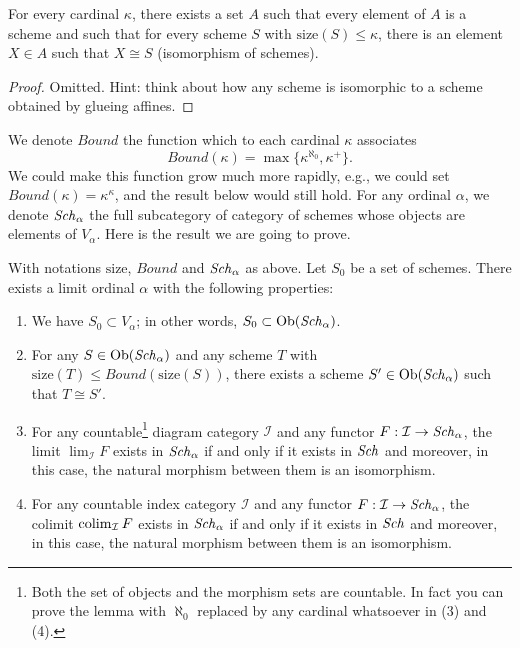 \begin{lemma}
\label{lemma-bounded-size}
For every cardinal $\kappa$, there exists a set $A$ such
that every element of $A$ is a scheme and such that for every
scheme $S$ with $\text{size}(S) \leq \kappa$, there is
an element $X \in A$ such that $X \cong S$ (isomorphism
of schemes).
\end{lemma}

\begin{proof}
Omitted. Hint: think about how any scheme is isomorphic to a scheme
obtained by glueing affines.
\end{proof}

\noindent
We denote $Bound$ the function which to each
cardinal $\kappa$ associates
\begin{equation}
\label{equation-bound}
Bound(\kappa) = \max\{\kappa^{\aleph_0}, \kappa^+\}.
\end{equation}
We could make this function grow much more rapidly, e.g., we could
set $Bound(\kappa) = \kappa^\kappa$, and the result below would still hold.
For any ordinal $\alpha$, we denote $\mathit{Sch}_\alpha$ the full
subcategory of category of schemes whose objects are elements of
$V_\alpha$. Here is the result we are going to prove.

\begin{lemma}
\label{lemma-construct-category}
With notations $\text{size}$, $Bound$ and $\mathit{Sch}_\alpha$ as above.
Let $S_0$ be a set of schemes. There exists a limit ordinal
$\alpha$ with the following properties:
\begin{enumerate}
\item
\label{item-inclusion}
We have $S_0 \subset V_\alpha$; in other words,
$S_0 \subset \mathop{\mathrm{Ob}}\nolimits(\mathit{Sch}_\alpha)$.
\item
\label{item-bounded}
For any $S \in \mathop{\mathrm{Ob}}\nolimits(\mathit{Sch}_\alpha)$ and any
scheme $T$ with $\text{size}(T) \leq Bound(\text{size}(S))$,
there exists a scheme $S' \in \mathop{\mathrm{Ob}}\nolimits(\mathit{Sch}_\alpha)$
such that $T \cong S'$.
\item
\label{item-limit}
For any countable\footnote{Both the set of objects and
the morphism sets are countable. In fact you can prove the lemma with
$\aleph_0$ replaced by any cardinal whatsoever in (3) and (4).} diagram
category $\mathcal{I}$ and
any functor $F : \mathcal{I} \to \mathit{Sch}_\alpha$, the limit
$\lim_\mathcal{I} F$ exists in $\mathit{Sch}_\alpha$ if and
only if it exists in $\mathit{Sch}$ and moreover, in this case,
the natural morphism between them is an isomorphism.
\item
\label{item-colimit}
For any countable index category $\mathcal{I}$ and
any functor $F : \mathcal{I} \to \mathit{Sch}_\alpha$, the colimit
$\mathop{\mathrm{colim}}\nolimits_\mathcal{I} F$ exists in $\mathit{Sch}_\alpha$ if and
only if it exists in $\mathit{Sch}$ and moreover, in this case,
the natural morphism between them is an isomorphism.
\end{enumerate}
\end{lemma}

